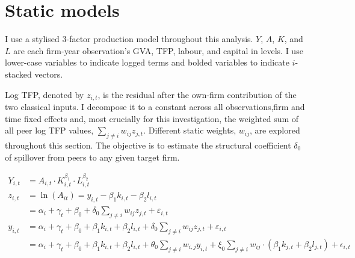 \section{Static models}
\label{s:models-static}

I use a stylised 3-factor production model throughout this analysis.
$Y$, $A$, $K$, and $L$ are each firm-year observation's GVA, TFP, labour, and capital in levels.
I use lower-case variables to indicate logged terms and bolded variables to indicate $i$-stacked vectors.
\par
Log TFP, denoted by $z_{i,t}$, is the residual after the own-firm contribution of the two classical inputs.
I decompose it to a constant across all observations,firm and time fixed effects and,
most crucially for this investigation,
the weighted sum of all peer log TFP values, $\sum_{j\neq i} w_{ij}z_{j,t}$.
Different static weights, $w_{ij}$, are explored throughout this section.
The objective is to estimate the structural coefficient $\delta_0$ of spillover from peers to any given target firm.

\begin{align}
    \label{eq:static-production-3-factor}
    Y_{i,t} &= A_{i,t} \cdot
                K_{i,t}^{\beta_1} \cdot
                L_{i,t}^{\beta_2}
    \\
    \label{eq:static-tfp-identity}
    z_{i,t} &= \ln(A_{it}) = y_{i,t} - \beta_1 k_{i,t} - \beta_2 l_{i,t}
    \\
    \label{eq:static-main-reduced}
            &= \alpha_i + \gamma_t + \beta_0 + \delta_0 \sum_{j\neq i} w_{ij}z_{j,t} + \varepsilon_{i,t}
    \\
    \label{eq:static-main-gva}
    y_{i,t} &= \alpha_i + \gamma_t + \beta_0
                + \beta_1 k_{i,t}
                + \beta_2 l_{i,t}
                + \delta_0 \sum_{j\neq i} w_{ij}z_{j,t}
                + \varepsilon_{i,t}
    \\
    \label{eq:static-main-peer-effects}
            &= \alpha_i + \gamma_t + \beta_0 + \beta_1 k_{i,t} + \beta_2 l_{i,t}
        + \theta_0 \sum_{j\neq i} w_{i,j}y_{i,t} + \xi_0 \sum_{j\neq i} w_{ij}\cdot (\beta_1 k_{j,t} + \beta_2 l_{j,t})
        + \epsilon_{i,t}
\end{align}


